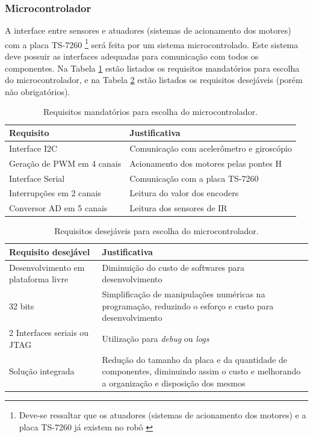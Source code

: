 \subsubsection{Microcontrolador}

A interface entre sensores e atuadores (sistemas de acionamento dos motores) com a placa TS-7260 \footnote{Deve-se ressaltar que os atuadores (sistemas de acionamento dos motores) e a placa TS-7260 já existem no robô \cite{bellator_2012}} será feita por um sistema microcontrolado. Este sistema deve possuir as interfaces adequadas para comunicação com todos os componentes. Na Tabela \ref{tab:requisitos_microcontrolador} estão listados os requisitos mandatórios para escolha do microcontrolador, e na Tabela \ref{tab:requisitos_desejaveis_microcontrolador} estão listados os requisitos desejáveis (porém não obrigatórios).

\begin{table}[h]
  \caption{Requisitos mandatórios para escolha do microcontrolador.}
  \centering
  \begin{tabular}{p{7cm}|p{8cm}}
    \toprule
    \textbf{Requisito} & \textbf{Justificativa} \\
    \hline
    Interface I2C & Comunicação com acelerômetro e giroscópio \\
    \hline
    Geração de PWM em 4 canais & Acionamento dos motores pelas pontes H \\
    \hline
    Interface Serial	 & Comunicação com a placa TS-7260 \\
    \hline
    Interrupções em 2 canais	 & Leitura do valor dos encoders \\
    \hline
    Conversor AD em 5 canais	 & Leitura dos sensores de IR \\
    \bottomrule
  \end{tabular}
  \label{tab:requisitos_microcontrolador}
\end{table}

\begin{table}[h]
  \caption{Requisitos desejáveis para escolha do microcontrolador.}
  \centering
  \begin{tabular}{p{7cm}|p{8cm}}
    \toprule
    \textbf{Requisito desejável} & \textbf{Justificativa} \\
    \hline
    Desenvolvimento em plataforma livre	 & Diminuição do custo de softwares para desenvolvimento \\
    \hline
    32 bits & Simplificação de manipulações numéricas na programação, reduzindo o esforço e custo para desenvolvimento \\
    \hline
    2 Interfaces seriais ou JTAG & Utilização para \textit{debug} ou \textit{logs} \\
    \hline
    Solução integrada & Redução do tamanho da placa e da quantidade de componentes, diminuindo assim o custo e melhorando a organização e disposição dos mesmos \\
    \bottomrule
  \end{tabular}
  \label{tab:requisitos_desejaveis_microcontrolador}
\end{table}

